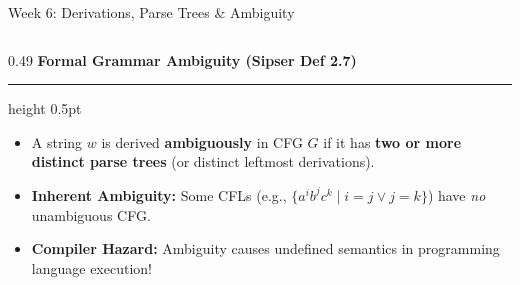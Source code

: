 \documentclass[aspectratio=169, 10pt]{beamer}
\newcommand{\colheader}[1]{%
  {\noindent\footnotesize\bfseries\color{gimpanavy}#1}%
  \vspace{0.03cm}%
  {\color{gimpanavy!30}\hrule height 0.5pt}%
  \vspace{0.08cm}%
}
\begin{document}
\begin{frame}{Week 6: Derivations, Parse Trees \& Ambiguity}
  \begin{columns}[T, onlytextwidth]
    \begin{column}{0.49\textwidth}
      \colheader{Formal Grammar Ambiguity (Sipser Def 2.7)}
      \begin{tcolorbox}[conceptcard]
        \begin{itemize}\setlength{\itemsep}{2.5pt}\footnotesize
          \item A string $w$ is derived \textbf{ambiguously} in CFG $G$ if it has \textbf{two or more distinct parse trees} (or distinct leftmost derivations).
          \item \textbf{Inherent Ambiguity:} Some CFLs (e.g., $\{a^i b^j c^k \mid i=j \lor j=k\}$) have \textit{no} unambiguous CFG.
          \item \textbf{Compiler Hazard:} Ambiguity causes undefined semantics in programming language execution!
        \end{itemize}
      \end{tcolorbox}
    \end{column}

    \hfill


\end{columns}
\end{frame}
\end{document}
